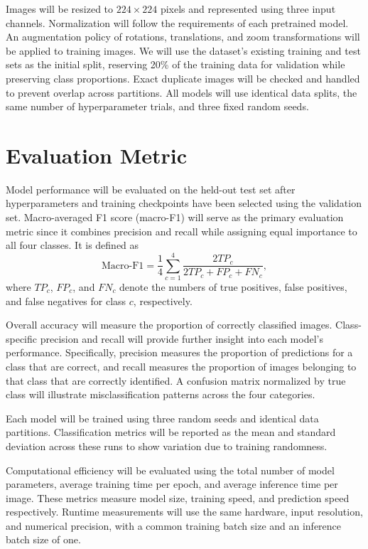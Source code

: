 \documentclass{article}
\begin{document}
Images will be resized to \(224 \times 224\) pixels and represented using three input channels. Normalization will follow the requirements
of each pretrained model. An augmentation policy of rotations, translations, and zoom transformations will be applied to training images.
We will use the dataset's existing training and test sets as the initial split, reserving 20\% of the training data for validation while
preserving class proportions. Exact duplicate images will be checked and handled to prevent overlap across partitions.  All models will use identical data splits,
the same number of hyperparameter trials, and three fixed random seeds.

\section*{Evaluation Metric}
Model performance will be evaluated on the held-out test set after hyperparameters and training checkpoints have been selected using the
validation set. Macro-averaged F1 score (macro-F1) will serve as the primary evaluation metric since it combines precision and recall while
assigning equal importance to all four classes. It is defined as
\[
\mathrm{Macro\text{-}F1}
=\frac{1}{4}\sum_{c=1}^{4}
\frac{2TP_c}{2TP_c+FP_c+FN_c},
\]
where \(TP_c\), \(FP_c\), and \(FN_c\) denote the numbers of true positives, false positives, and false negatives for class \(c\), respectively.

Overall accuracy will measure the proportion of correctly classified images. Class-specific precision and recall will provide further insight
into each model's performance. Specifically, precision measures the proportion of predictions for a class that are correct, and recall measures the
proportion of images belonging to that class that are correctly identified. A confusion matrix normalized by true class will illustrate
misclassification patterns across the four categories.

Each model will be trained using three random seeds and identical data partitions. Classification metrics will be reported as the mean and
standard deviation across these runs to show variation due to training randomness.

Computational efficiency will be evaluated using the total number of model parameters, average training time per epoch, and average inference
time per image. These metrics measure model size, training speed, and prediction speed respectively. Runtime measurements will use the
same hardware, input resolution, and numerical precision, with a common training batch size and an inference batch size of one.
\end{document}
